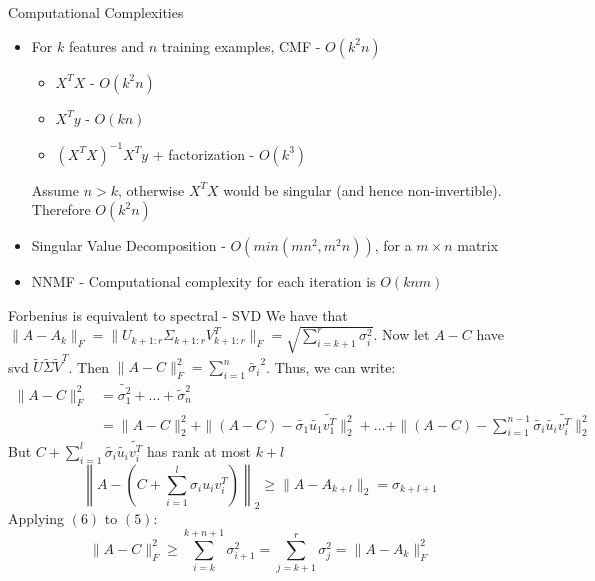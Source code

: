 \documentclass{beamer}
\begin{document}
\begin{frame}{Computational Complexities}
    \begin{itemize}
        \item For $k$ features and $n$ training examples, CMF - $O(k^2 n)$ 
            \begin{itemize}
                \item $X^T X $ - $O(k^2 n)$ 
                \item $X^T y $ - $O(kn)$
                \item $(X^TX)^{-1} X^T y$ + factorization - $O(k^3)$
            \end{itemize}
            Assume $n>k$, otherwise $X^T X$ would be singular (and hence non-invertible). Therefore $O(k^2 n)$
        \item Singular Value Decomposition - $O(min(mn^2, m^2n))$, for a $m \times n$ matrix
        \item NNMF - Computational complexity for each iteration is $O(knm)$
    \end{itemize}
\end{frame}
\begin{frame}{Forbenius is equivalent to spectral - SVD}
    We have that $\| A - A_k\|_F = \|U_{k+1:r}\Sigma_{k+1:r} V_{k+1:r}^T\|_F = \sqrt{\sum_{i=k+1}^r \sigma_i^2}$. Now let $A-C$ have svd $\widetilde{U}\widetilde{\Sigma}\widetilde{V}^T$. Then $\| A - C\|_F^2 = \sum_{i=1}^n \widetilde{\sigma_i}^2$. Thus, we can write:
    {\tiny \begin{equation} \begin{split} \| A - C \|_F^2 &= \widetilde{\sigma_1^2} + \dots + \widetilde{\sigma}_n^2 \\
            &= \| A - C\|_2^2 + \| (A - C) - \widetilde{\sigma_1} \widetilde{u_1}\widetilde{v_1^T} \|_2^2 + \dots + \| (A - C) - \sum_{i=1}^{n-1}\widetilde{\sigma_i} \widetilde{u_i}\widetilde{v_i^T} \|_2^2 \end{split} \end{equation}
    But $C + \sum_{i=1}^l \widetilde{\sigma_i} \widetilde{u_i}\widetilde{v_i^T}$ has rank at most $k+l$
    \begin{equation}
        \left \| A - (C + \sum_{i=1}^l \sigma_i u_i v_i^T ) \right \|_2 \geq \| A - A_{k+l} \|_2 = \sigma_{k+l+1} 
    \end{equation}
    Applying $(6)$ to $(5)$:
    \begin{equation}
        \| A - C \|_F^2 \geq \sum_{i=k}^{k+n+1} \sigma_{i+1}^2 = \sum_{j=k+1}^{r} \sigma_j^2 = \|A - A_k\|_F^2 
    \end{equation}}
\end{frame}
            
\end{document}
